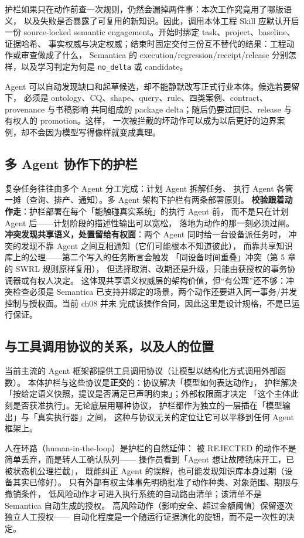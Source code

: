 护栏如果只在动作前查一次规则，仍然会漏掉两件事：本次工作究竟用了哪版语义，
以及失败是否暴露了可复用的新知识。因此，调用本体工程 Skill 应默认开启一份
source-locked semantic engagement。开始时绑定 task、project、baseline、证据哈希、
事实权威与决定权威；结束时固定交付三份互不替代的结果：工程动作或审查做成了什么，
Semantica 的 execution/regression/receipt/release 分别怎样，以及学习判定为何是
\texttt{no\_delta} 或 candidate。

Agent 可以自动发现缺口和起草候选，却不能静默改写正式行业本体。候选若要留下，
必须是 ontology、CQ、shape、query、rule、四类案例、contract、provenance 与书稿影响
共同组成的 package delta；随后仍要过回归、release 与有权人的 promotion。这样，
一次被拦截的坏动作可以成为以后更好的边界案例，却不会因为模型写得像样就变成真理。

\subsection{多 Agent 协作下的护栏}

复杂任务往往由多个 Agent 分工完成：计划 Agent 拆解任务、
执行 Agent 各管一摊（查询、排产、通知）。多 Agent 架构下护栏有两条部署原则。
\textbf{校验跟着动作走}：护栏部署在每个「能触碰真实系统」的执行 Agent 前，
而不是只在计划 Agent 后——计划阶段的描述性输出可以宽松，
落地为动作的那一刻必须过闸。
\textbf{冲突发现共享语义，处置留给有权面}：两个 Agent 同时给一台设备派任务时，
冲突的发现不靠 Agent 之间互相通知（它们可能根本不知道彼此），
而靠共享知识库上的公理——第二个写入的任务断言会触发
「同设备时间重叠」冲突（第 5 章的 SWRL 规则原样复用），
但选择取消、改期还是升级，只能由获授权的事务协调器或有权人决定。
这体现共享语义权威层的架构价值，但“有公理”还不够：冲突检查必须是 Semantica
已支持并绑定的场景，两个动作还要进入同一事务/并发控制与授权面。当前 ch08 并未
完成该操作合同，因此这里是设计规格，不是已运行保证。

\subsection{与工具调用协议的关系，以及人的位置}

当前主流的 Agent 框架都提供工具调用协议（让模型以结构化方式调用外部函数）。
本体护栏与这些协议是\textbf{正交}的：协议解决「模型如何表达动作」，
护栏解决「按给定语义快照，提议是否满足已声明约束」；外部权限面才决定
「这个主体此刻是否获准执行」。无论底层用哪种协议，
护栏都作为独立的一层插在「模型输出」与「真实执行器」之间，
这种与协议无关的定位让它可以平移到任何 Agent 框架上。

人在环路（human-in-the-loop）是护栏的自然延伸：
被 REJECTED 的动作不是简单丢弃，而是转人工确认队列——
操作员看到「Agent 想让故障铣床开工，已被状态机公理拦截」，
既能纠正 Agent 的误解，也可能发现知识库本身过期（设备其实已修好）。
只有外部有权主体事先明确批准了动作种类、对象范围、期限与撤销条件，
低风险动作才可进入执行系统的自动路由清单；该清单不是 Semantica 自动生成的授权。
高风险动作（影响安全、超过金额阈值）保留逐次独立人工授权——
自动化程度是一个随运行证据演化的旋钮，而不是一次性的决定。

